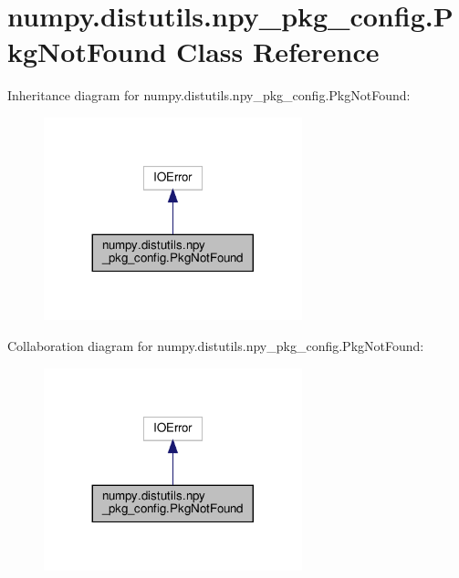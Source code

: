 \hypertarget{classnumpy_1_1distutils_1_1npy__pkg__config_1_1PkgNotFound}{}\section{numpy.\+distutils.\+npy\+\_\+pkg\+\_\+config.\+Pkg\+Not\+Found Class Reference}
\label{classnumpy_1_1distutils_1_1npy__pkg__config_1_1PkgNotFound}


Inheritance diagram for numpy.\+distutils.\+npy\+\_\+pkg\+\_\+config.\+Pkg\+Not\+Found\+:
\nopagebreak
\begin{figure}[H]
\begin{center}
\leavevmode
\includegraphics[width=212pt]{classnumpy_1_1distutils_1_1npy__pkg__config_1_1PkgNotFound__inherit__graph}
\end{center}
\end{figure}


Collaboration diagram for numpy.\+distutils.\+npy\+\_\+pkg\+\_\+config.\+Pkg\+Not\+Found\+:
\nopagebreak
\begin{figure}[H]
\begin{center}
\leavevmode
\includegraphics[width=212pt]{classnumpy_1_1distutils_1_1npy__pkg__config_1_1PkgNotFound__coll__graph}
\end{center}
\end{figure}
